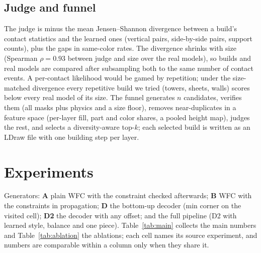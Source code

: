 \documentclass[10pt,twocolumn]{article}
\begin{document}
\subsection{Judge and funnel}
The judge is minus the mean Jensen--Shannon divergence \cite{lin1991divergence} between a build's contact statistics
and the learned ones (vertical pairs, side-by-side pairs, support counts), plus the gaps in same-color rates. The
divergence shrinks with size (Spearman $\rho=0.93$ between judge and size over the real models), so builds and real
models are compared after subsampling both to the same number of contact events. A per-contact likelihood would be
gamed by repetition; under the size-matched divergence every repetitive build we tried (towers, sheets, walls) scores
below every real model of its size.
The funnel generates $n$ candidates, verifies them (all masks plus physics and a size floor), removes near-duplicates
in a feature space (per-layer fill, part and color shares, a pooled height map), judges the rest, and selects a
diversity-aware top-$k$; each selected build is written as an LDraw file with one building step per layer.

\section{Experiments}\label{sec:experiments}

Generators: \textbf{A} plain WFC with the constraint checked afterwards; \textbf{B} WFC with the constraints in
propagation; \textbf{D} the bottom-up decoder (min corner on the visited cell); \textbf{D2} the decoder with any
offset; and the full pipeline (D2 with learned style, balance and one piece). Table~\ref{tab:main} collects the main
numbers and Table~\ref{tab:ablation} the ablations; each cell names its source experiment, and numbers are comparable
within a column only when they share it.

\begin{table}[t]
  \centering\small
  \resizebox{\textwidth}{!}{}
  \caption{Main results per generator. Superscripts name the source experiment, and setups differ: m6/m7 plates
    without inventory; m9 plates of 10 sets; m9b the full catalog of 10 sets; m10 28 sets, held-out folds; m11 10 sets
    $\times$ 5 shapes; dm the spaceship demo from 6 sets; bl/cn the balance and one-piece studies; dv the diversity
    pass; pr the learned-proposal comparison; bg BrickGPT's structures. Percent columns are shares of attempted builds; utilization and fill are over finished
    builds. Diversity: effective share of distinct designs among verified candidates, distances in units of the
    setup's typical D2 distance.}
  \label{tab:main}
\end{table}
\end{document}
